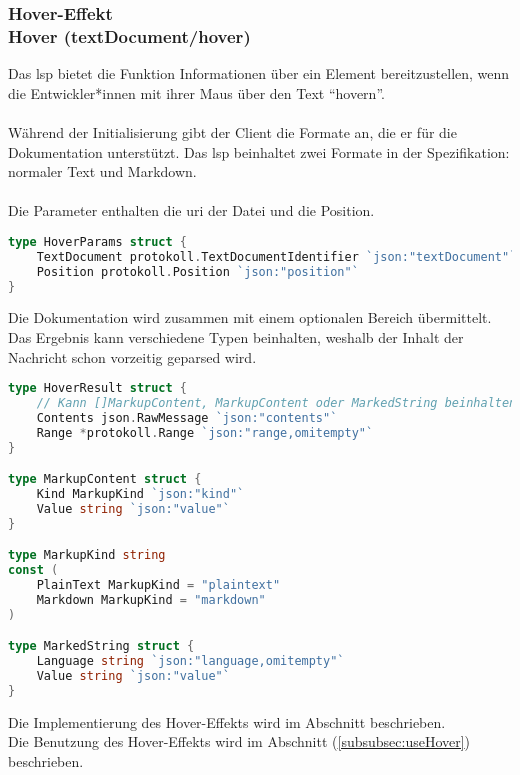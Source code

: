 \documentclass[./einleitung.tex]{subfiles}
\begin{document}
    \subsubsection[Hover-Effekt]{Hover-Effekt\\ {\textnormal{\footnotesize Hover (textDocument/hover) \cite{hover}}}}\label{subsubsec:hover}
    Das \acrshort{lsp} bietet die Funktion Informationen über ein Element bereitzustellen, wenn die Entwickler*innen mit ihrer Maus über den Text ``hovern''.
    \\\\
    Während der Initialisierung gibt der Client die Formate an, die er für die Dokumentation unterstützt.
    Das \acrshort{lsp} beinhaltet zwei Formate in der Spezifikation: normaler Text und Markdown.
    \\\\
    Die Parameter enthalten die \acrshort{uri} der Datei und die Position.
    \begin{lstlisting}[language=Go, caption=Definition der Hover Parameter, label=lst:hoverParams]
type HoverParams struct {
	TextDocument protokoll.TextDocumentIdentifier `json:"textDocument"`
	Position protokoll.Position `json:"position"`
}
    \end{lstlisting}
    Die Dokumentation wird zusammen mit einem optionalen Bereich übermittelt.
    Das Ergebnis kann verschiedene Typen beinhalten, weshalb der Inhalt der Nachricht schon vorzeitig geparsed wird.
    \begin{lstlisting}[language=Go, caption=Definition des Hover Ergebnis, label=lst:hover]
type HoverResult struct {
    // Kann []MarkupContent, MarkupContent oder MarkedString beinhalten.
	Contents json.RawMessage `json:"contents"`
	Range *protokoll.Range `json:"range,omitempty"`
}

type MarkupContent struct {
	Kind MarkupKind `json:"kind"`
	Value string `json:"value"`
}

type MarkupKind string
const (
	PlainText MarkupKind = "plaintext"
	Markdown MarkupKind = "markdown"
)

type MarkedString struct {
	Language string `json:"language,omitempty"`
	Value string `json:"value"`
}
    \end{lstlisting}
    Die Implementierung des Hover-Effekts wird im Abschnitt  beschrieben.\\
    Die Benutzung des Hover-Effekts wird im Abschnitt  (\ref{subsubsec:useHover}) beschrieben.
\end{document}
